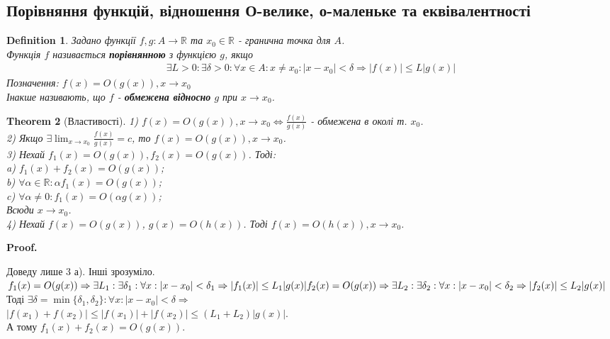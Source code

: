 \documentclass[a4paper, 14pt]{article}
\makeatletter
\def\huge{\displaystyle}
\def\qed{$\blacksquare$}
\theoremstyle{theoremdd}
\newtheorem{theorem}{Theorem}[subsection]
\theoremstyle{theoremdd}
\newtheorem{definition}[theorem]{Definition}
\theoremstyle{theoremdd}
\theoremstyle{theoremdd}
\theoremstyle{theoremdd}
\theoremstyle{theoremdd}
\theoremstyle{theoremdd}
\theoremstyle{theoremdd}
\renewenvironment{proof}[1][Proof.\\]{\par
\pushQED{\hfill \qed}%
\normalfont \topsep6\p@\@plus6\p@\relax
\trivlist
\item\relax
{\bfseries
#1\@addpunct{.}}\hspace\labelsep\ignorespaces
}{%
\popQED\endtrivlist\@endpefalse
}
\makeatother
\begin{document}
\subsection{Порівняння функцій, відношення О-велике, о-маленьке та еквівалентності}
\begin{definition}
Задано функції $f,g: A \to \mathbb{R}$ та $x_0 \in \mathbb{R}$ - гранична точка для $A$.\\
Функція $f$ називається \textbf{порівнянною} з функцією $g$, якщо
\begin{align*}
\exists L>0: \exists \delta > 0: \forall x \in A: x \neq x_0: |x-x_0| < \delta \Rightarrow |f(x)| \leq L |g(x)|
\end{align*}
Позначення: $f(x) = O(g(x)), x \to x_0$\\
Інакше називають, що $f$ - \textbf{обмежена відносно} $g$ при $x \to x_0$.
\end{definition}

\begin{theorem}[Властивості]
1) $f(x) = O(g(x)), x \to x_0 \iff \huge \frac{f(x)}{g(x)}$ - обмежена в околі т. $x_0$.
\bigskip \\
2) Якщо $\exists \huge \lim_{x \to x_0} \frac{f(x)}{g(x)} = c$, то $f(x) = O(g(x)), x \to x_0$.
\bigskip \\
3) Нехай $f_1(x) = O(g(x)), f_2(x) = O(g(x))$. Тоді:\\
a) $f_1(x) + f_2(x) = O(g(x))$;\\
b) $\forall \alpha \in \mathbb{R}: \alpha f_1(x) = O(g(x))$;\\
c) $\forall \alpha \neq 0: f_1(x) = O(\alpha g(x))$;\\
Всюди $x \to x_0$.
\bigskip \\
4) Нехай $f(x) = O(g(x))$, $g(x) = O(h(x))$. Тоді $f(x) = O(h(x)), x \to x_0$.
\end{theorem}

\begin{proof}
Доведу лише 3 а). Інші зрозуміло.\\
$f_1(x) = O(g(x)) \Rightarrow \exists L_1: \exists \delta_1: \forall x : |x-x_0| < \delta_1 \Rightarrow |f_1(x)| \leq L_1 |g(x)| \\
f_2(x) = O(g(x)) \Rightarrow \exists L_2: \exists \delta_2: \forall x : |x-x_0| < \delta_2 \Rightarrow |f_2(x)| \leq L_2 |g(x)|$\\
Тоді $\exists \delta = \min\{\delta_1, \delta_2 \}: \forall x: |x-x_0|<\delta \Rightarrow$\\
$|f(x_1)+f(x_2)| \leq |f(x_1)|+|f(x_2)| \leq (L_1+L_2)|g(x)|$.\\
А тому $f_1(x) + f_2(x) = O(g(x))$.
\end{proof}
\end{document}

